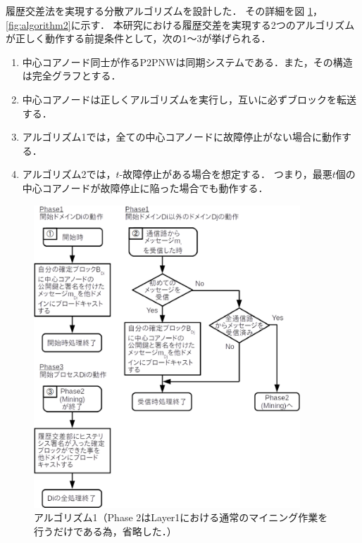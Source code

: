 \documentclass[a4paper,12pt]{jsarticle}
\begin{document}
履歴交差法を実現する分散アルゴリズム\cite{manabe}を設計した．
その詳細を図 \ref{fig:algorithm1}，\ref{fig:algorithm2}に示す．
本研究における履歴交差を実現する2つのアルゴリズムが正しく動作する前提条件として，次の1〜3が挙げられる．

\hspace{3mm}
%
\begin{enumerate}
    \item 中心コアノード同士が作るP2PNWは同期システムである．また，その構造は完全グラフとする．
    
    \item 中心コアノードは正しくアルゴリズムを実行し，互いに必ずブロックを転送する．
    
    \item アルゴリズム1では，全ての中心コアノードに故障停止がない場合に動作する．
    
    \item アルゴリズム2では，$t$-故障停止がある場合を想定する．
        つまり，最悪$t$個の中心コアノードが故障停止に陥った場合でも動作する．
\end{enumerate}
%
\hspace{3mm}
%
\begin{figure}[H]%
  \begin{center}
    \includegraphics[width=100mm]{pht/flow_chart-algorithm1.eps}
  \end{center}
  \caption{アルゴリズム1（Phase 2はLayer1における通常のマイニング作業を行うだけである為，省略した．）}
  \label{fig:algorithm1}
\end{figure}
\end{document}
